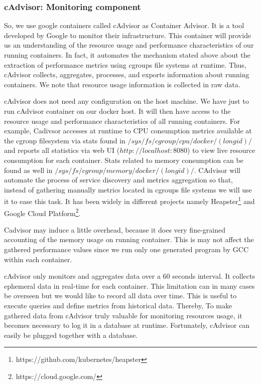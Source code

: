\subsubsection{cAdvisor: Monitoring component}
So, we use google containers called cAdvisor as Container Advisor. It is a tool developed by Google to monitor their infrastructure. This container will provide us an understanding of the resource usage and performance characteristics of our running containers. In fact, it automates the mechanism stated above about the extraction of performance metrics using cgroups file systems at runtime. Thus, cAdvisor collects, aggregates, processes, and exports information about running containers. We note that resource usage information is collected in raw data.

cAdvisor does not need any configuration on the host machine. We have just to run cAdvisor container on our docker host. It will then have access to the resource usage and performance characteristics of all running containers. For example, Cadivsor accesses at runtime to CPU consumption metrics available at the cgroup filesystem via stats found in $/sys/fs/cgroup/cpu/docker/(longid)/$ and reports all statistics via web UI ($http://localhost:8080$) to view live resource consumption for each container. Stats related to memory consumption can be found as well in $/sys/fs/cgroup/memory/docker/(longid)/$. CAdvisor will automate the process of service discovery and metrics aggregation so that, instead of gathering manually metrics located in cgroups file systems we will use it to ease this task. It has been widely in different projects namely Heapster\footnote{https://github.com/kubernetes/heapster} and Google Cloud Platform\footnote{https://cloud.google.com/}.

Cadvisor may induce a little overhead, because it does very fine-grained accounting of the memory usage on running container. This is may not affect the gathered performance values since we run only one generated program by GCC within each container.

cAdvisor only monitors and aggregates data over a 60 seconds interval. It collects ephemeral data in real-time for each container. This limitation can in many cases be overseen but we would like to record all data over time. This is useful to execute queries and define metrics from historical data. Thereby, To make gathered data from cAdvisor truly valuable for monitoring resources usage, it becomes necessary to log it in a database at runtime. Fortunately, cAdvisor can easily be plugged together with a database.

